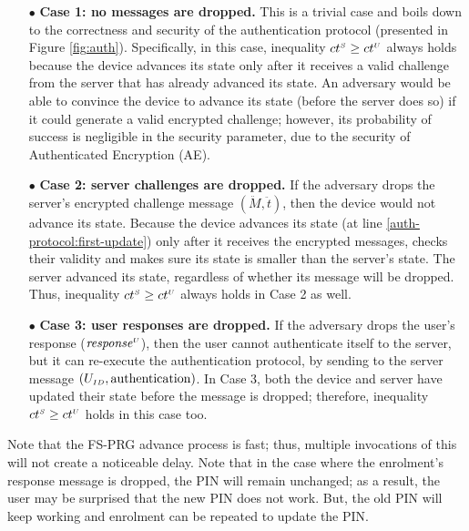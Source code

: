 \begin{itemize}
%
\item[$\bullet$] \textbf{Case 1: no messages are dropped.} This is a trivial case and boils down to the correctness and security of the authentication protocol  (presented in Figure \ref{fig:auth}). Specifically, in this case, inequality  ${ct}^{\scriptscriptstyle S} \geq {ct}^{\scriptscriptstyle U}$ always holds because the device advances its state only after it receives a valid challenge from the server that has already advanced its state. An adversary would be able to convince the device to advance its state (before the server does so) if it could generate a valid encrypted challenge; however, its probability of success is negligible in the security parameter, due to the security of Authenticated Encryption (AE). 
%
\item[$\bullet$] \textbf{Case 2: server challenges are dropped.} If the adversary drops the server's encrypted challenge message $(\ddot M, \ddot t)$, then the device would not advance its state. Because the device advances its state (at line \ref{auth-protocol:first-update}) only after it receives the encrypted messages, checks their validity and makes sure its state is smaller than the server's state. The server advanced its state, regardless of whether its message will be dropped. Thus, inequality  ${ct}^{\scriptscriptstyle S} \geq {ct}^{\scriptscriptstyle U}$ always holds in Case 2 as well. 
%
\item[$\bullet$] \textbf{Case 3: user responses are dropped.} If the adversary drops the user's response (\ie $\mathit{response}^{\scriptscriptstyle U}$), then the user cannot authenticate itself to the server, but it can re-execute the authentication protocol, by sending to the server message $(U_{\scriptscriptstyle ID}, \text{authentication})$. In Case 3, both the device and server have updated their state before the message is dropped; therefore, inequality ${ct}^{\scriptscriptstyle S} \geq {ct}^{\scriptscriptstyle U}$  holds in this case too.   
%
\end{itemize}







Note that 
the FS-PRG advance process is fast; thus,  multiple invocations of this will not create a noticeable delay.
%
 Note that in the case where the enrolment's response message is dropped, the PIN will remain unchanged; as a result,  the user may be surprised that the new PIN does not work. But, the old PIN will keep working and enrolment can be repeated to update the PIN.
